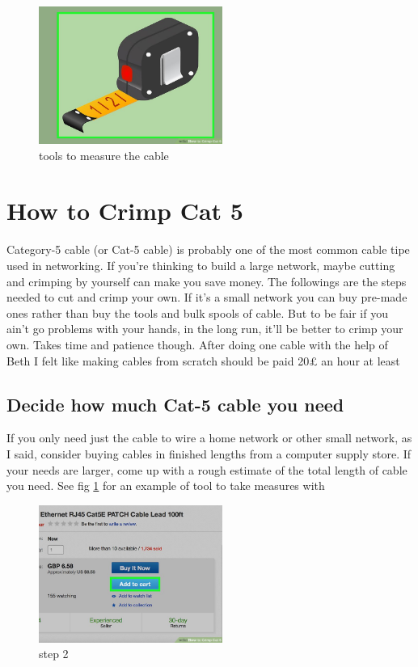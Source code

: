 \documentclass[a4paper,12pt]{book}
\begin{document}
\begin{figure}
\centering
\includegraphics[width= 6cm]{./meter.JPG}
\caption{tools to measure the cable}\label{fig:meter}
\end{figure}

\section{How to Crimp Cat 5}
Category-5 cable (or Cat-5 cable) is probably one of the most common cable tipe used in networking.
If you're thinking to build a large network, maybe cutting and crimping by yourself can make you save money. The followings are the steps needed to cut and crimp your own. If it's a small network you can buy pre-made ones rather than buy the tools and bulk spools of cable. But to be fair if you ain't go problems with your hands, in the long run, it'll be better to crimp your own. Takes time and patience though. After doing one cable with the help of Beth I felt like making cables from scratch should be paid 20£ an hour at least

\subsection{Decide how much Cat-5 cable you need}
If you only need just the cable to wire a home network or other small network, as I said, consider buying cables in finished lengths from a computer supply store. If your needs are larger, come up with a rough estimate of the total length of cable you need. See fig \ref{fig:meter} for an example of tool to take measures with

\clearpage

\begin{figure}
\centering
\includegraphics[width= 6cm]{./step2.JPG}
\caption{step 2}\label{fig:step2}
\end{figure}
\end{document}
